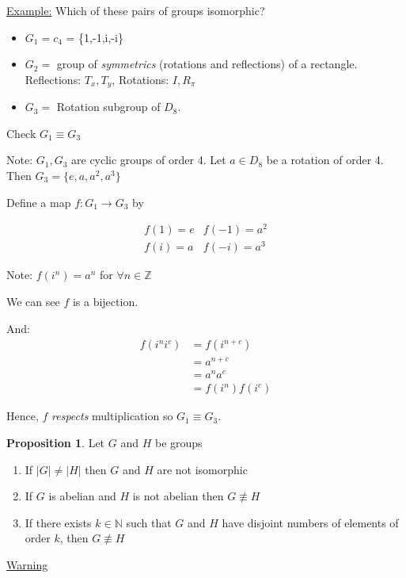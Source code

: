 \documentclass{article}
\theoremstyle{definition}
\newtheorem{proposition}[theorem]{Proposition}
\begin{document}
\underline{Example:} Which of these pairs of groups isomorphic?
\begin{itemize}
  \item 
$G_1 = c_4$ = \{1,-1,i,-i\}
  \item
$G_2 = $ group of \emph{symmetrics} (rotations and reflections) of a rectangle.
Reflections: $T_x, T_y$, Rotations: $I, R_\pi$
  \item $G_3 = $ Rotation subgroup of $D_8$.
\end{itemize}

Check $G_1 \equiv G_3$

Note: $G_1, G_3$ are cyclic groups of order 4. Let $a \in D_8$ be a rotation of order 4. Then $G_3 = \{e,a,a^2, a^3\}$

Define a map $f:G_1 \rightarrow G_3$ by 

\begin{equation*}
  \begin{matrix}
    f(1)=e & f(-1) = a^2 \\
    f(i)=a & f(-i) = a^3
  \end{matrix}
  \label{}
\end{equation*}

Note: $f(i^n) = a^n$ for $\forall n \in \mathbb{Z}$

We can see $f$ is a bijection.

And: 
\begin{align*}
  f(i^ni^c) &= f(i^{n+c})\\
  &= a^{n+c} \\
  &= a^n a^c \\
  &= f(i^n)f(i^c)
\end{align*}

Hence, $f$ \emph{respects} multiplication so $G_1 \equiv G_3.$

\begin{proposition}
  Let $G$ and $H$ be groups 
  \begin{enumerate}
    \item If $|G| \neq |H|$ then $G$ and $H$ are not isomorphic
    \item If $G$ is abelian and $H$ is not abelian then $G \not\equiv H$
    \item If there exists $k \in \mathbb{N}$ such that $G$ and $H$ have disjoint numbers of elements of order $k$, then $G \not\equiv H$
  \end{enumerate}
\end{proposition}

\underline{Warning}
\end{document}
